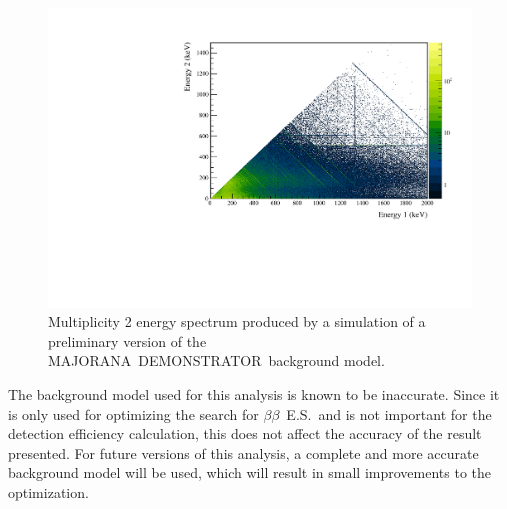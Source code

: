 \documentclass[notitlepage,rmp,aps,10pt]{revtex4-1}
\newcommand{\MJ}{M{\footnotesize AJORANA}}
\newcommand{\Demo}{D{\footnotesize EMON\-STRAT\-OR}}
\newcommand{\MJD}{\MJ\ \Demo}
\newcommand{\bb}{${\beta \beta}$}
\newcommand{\bbes}{\bb~E.S.}
\begin{document}
\begin{figure}
  \centering
  \includegraphics[width=.9\linewidth]{BGsim2D}
  \caption[Simulation of multiplicty 2 events from the background model]{ \label{fig:bgsim2D}
    Multiplicity 2 energy spectrum produced by a simulation of a preliminary version of the \MJD\ background model.
  }
\end{figure}
The background model used for this analysis is known to be inaccurate.
Since it is only used for optimizing the search for \bbes\ and is not important for the detection efficiency calculation, this does not affect the accuracy of the result presented.
For future versions of this analysis, a complete and more accurate background model will be used, which will result in small improvements to the optimization.
\end{document}
